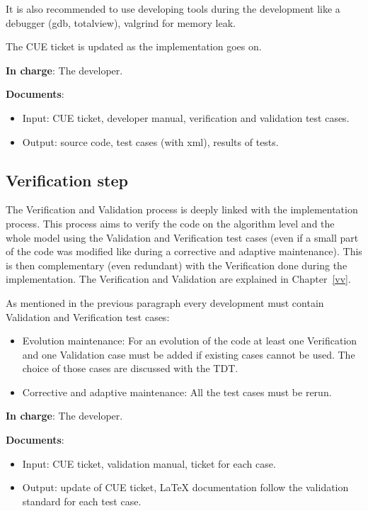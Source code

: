 It is also recommended to use developing tools during the development like a
debugger (gdb, totalview), valgrind for memory leak.

The CUE ticket is updated as the implementation goes on.

\textbf{In charge}: The developer.

\textbf{Documents}:
\begin{itemize}
\item Input: CUE ticket, developer manual, verification and validation test cases.
\item Output: source code, test cases (with xml), results of tests.
\end{itemize}

\subsection{Verification step}

The Verification and Validation process is deeply linked with the
implementation process. This process aims to verify the code on the algorithm
level and the whole model using the Validation and Verification test cases
(even if a small part of the code was modified like during a corrective and
adaptive maintenance). This is then complementary (even redundant) with the
Verification done during the implementation. The Verification and Validation
are explained in Chapter~\ref{vv}.

As mentioned in the previous paragraph every development must contain
Validation and Verification test cases:
\begin{itemize}
\item Evolution maintenance: For an evolution of the code at least one
  Verification and one Validation case must be added if existing cases cannot
  be used. The choice of those cases are discussed with the TDT\@.
\item Corrective and adaptive maintenance: All the test cases must be rerun.
\end{itemize}

\textbf{In charge}: The developer.

\textbf{Documents}:
\begin{itemize}
\item Input: CUE ticket, validation manual, ticket for each case.
\item Output: update of CUE ticket, \LaTeX\xspace documentation follow the validation
standard for each test case.
\end{itemize}

